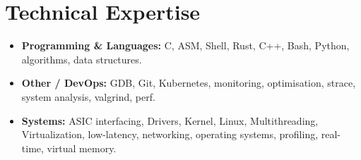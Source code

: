 \documentclass[9pt,a4paper]{article}
\begin{document}
\section*{Technical Expertise}
\begin{tcolorbox}[mybox]
\begin{itemize}
\item \textbf{Programming \& Languages:} C, ASM, Shell, Rust, C++, Bash, Python, algorithms, data structures.

\item \textbf{Other / DevOps:} GDB, Git, Kubernetes, monitoring, optimisation, strace, system analysis, valgrind, perf.

\item \textbf{Systems:} ASIC interfacing, Drivers, Kernel, Linux, Multithreading, Virtualization, low-latency, networking, operating systems, profiling, real-time, virtual memory.
\end{itemize}
\end{tcolorbox}
\end{document}

